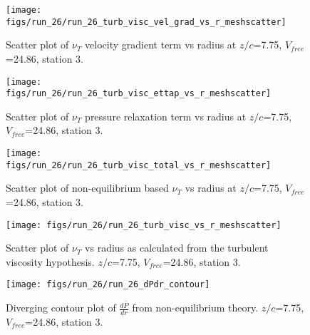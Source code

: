 \begin{figure}[H]
\centering
\texttt{[image: figs/run\_26/run\_26\_turb\_visc\_vel\_grad\_vs\_r\_meshscatter]}
\caption{Scatter plot of $\nu_T$ velocity gradient term vs radius at $z/c$=7.75, $V_{free}$=24.86, station 3.}
\end{figure}


\begin{figure}[H]
\centering
\texttt{[image: figs/run\_26/run\_26\_turb\_visc\_ettap\_vs\_r\_meshscatter]}
\caption{Scatter plot of $\nu_T$ pressure relaxation term vs radius at $z/c$=7.75, $V_{free}$=24.86, station 3.}
\end{figure}


\begin{figure}[H]
\centering
\texttt{[image: figs/run\_26/run\_26\_turb\_visc\_total\_vs\_r\_meshscatter]}
\caption{Scatter plot of non-equilibrium based $\nu_T$ vs radius at $z/c$=7.75, $V_{free}$=24.86, station 3.}
\end{figure}


\begin{figure}[H]
\centering
\texttt{[image: figs/run\_26/run\_26\_turb\_visc\_vs\_r\_meshscatter]}
\caption{Scatter plot of $\nu_T$ vs radius as calculated from the turbulent viscosity hypothesis. $z/c$=7.75, $V_{free}$=24.86, station 3.}
\end{figure}


\begin{figure}[H]
\centering
\texttt{[image: figs/run\_26/run\_26\_dPdr\_contour]}
\caption{Diverging contour plot of $\frac{d\bar{P}}{dr}$ from non-equilibrium theory. $z/c$=7.75, $V_{free}$=24.86, station 3.}
\end{figure}


